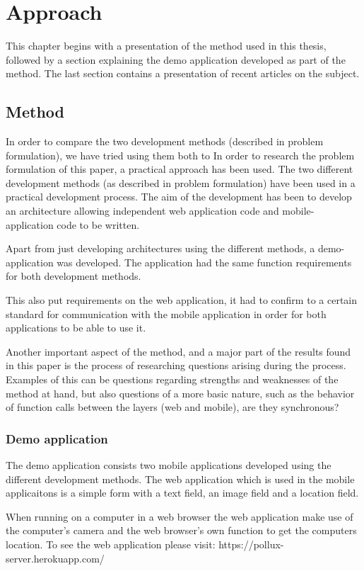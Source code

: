 
\chapter{Approach}
This chapter begins with a presentation of the method used in this thesis, followed by a section explaining the demo application developed as part of the method. The last section contains a presentation of recent articles on the subject. 
\section{Method}
In order to compare the two development methods (described in problem formulation), we have tried using them both to 
In order to research the problem formulation of this paper, a practical approach has been used. The two different development methods (as described in problem formulation) have been used in a practical development process. The aim of the development has been to develop an architecture allowing independent web application code and mobile-application code to be written.

Apart from just developing architectures using the different methods, a demo-application was developed. The application had the same function requirements for both development methods. 

This also put requirements on the web application, it had to confirm to a certain standard for communication with the mobile application in order for both applications to be able to use it. 

Another important aspect of the method, and a major part of the results found in this paper is the process of researching questions arising during the process. Examples of this can be questions regarding strengths and weaknesses of the method at hand, but also questions of a more basic nature, such as the behavior of function calls between the layers (web and mobile), are they synchronous?

\subsection{Demo application}
The demo application consists two mobile applications developed using the different development methods. The web application which is used in the mobile applicaitons is a simple form with a text field, an image field and a location field.

When running on a computer in a web browser the web application make use of the computer's camera and the web browser's own function to get the computers location. To see the web application please visit: https://pollux-server.herokuapp.com/


